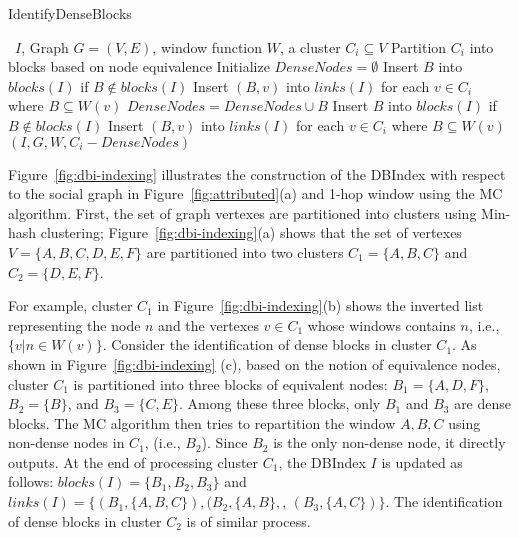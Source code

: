 \begin{algorithm}
\caption{IdentifyDenseBlocks}
\begin{algorithmic}[1] \small
\Require \DBIndex\ $I$, Graph $G=(V,E)$, window function $W$, a cluster $C_i \subseteq V$
\State Partition $C_i$ into blocks based on node equivalence
\State Initialize $DenseNodes = \emptyset$
	\State Insert $B$ into $blocks(I)$ if $B \not\in blocks(I)$
	\State Insert $(B,v)$ into $links(I)$ for each $v \in C_i$ where $B \subseteq W(v)$
	\State $DenseNodes = DenseNodes \cup B$
\EndFor
{}
		\State Insert $B$ into $blocks(I)$ if $B \not\in blocks(I)$
		\State Insert $(B,v)$ into $links(I)$ for each $v \in C_i$ where $B \subseteq W(v)$
	\EndFor
{}
		 $(I,G,W,C_i - DenseNodes)$
	\EndIf
\EndIf
\end{algorithmic}
\label{algo:identify}
\end{algorithm}

Figure~\ref{fig:dbi-indexing} 
illustrates the construction of the DBIndex with respect to the social graph in 
Figure~\ref{fig:attributed}(a) and 1-hop window using the MC algorithm.
First, the set of graph vertexes are partitioned into clusters using Min-hash clustering;
Figure~\ref{fig:dbi-indexing}(a)
shows that the set of vertexes $V = \{A, B, C, D, E, F \}$ are partitioned into two clusters $C_1=\{A, B, C\}$ and $C_2=\{D, E, F\}$. 

For example, cluster $C_1$ in 
Figure~\ref{fig:dbi-indexing}(b) shows the inverted list representing
the node $n$ and the vertexes $v \in C_1$ whose windows contains $n$, i.e., $\{v | n \in W(v) \}$.
%
Consider the identification of dense blocks in cluster $C_1$.
As shown in Figure~\ref{fig:dbi-indexing} (c), based on the notion of equivalence nodes,
cluster $C_1$ is partitioned into three blocks of equivalent nodes:
$B_1=\{A,D,F\}$, $B_2=\{B\}$, and $B_3=\{C,E\}$.
Among these three blocks, only
$B_1$ and $B_3$ are dense blocks.
The MC algorithm then tries to repartition the window $A,B,C$ using non-dense nodes in $C_1$,
(i.e., $B_2$). Since $B_2$ is the only non-dense node, it directly outputs.
At the end of processing cluster $C_1$,
the DBIndex $I$ is updated as follows:
$blocks(I) = \{B_1, B_2, B_3\}$ 
and
$links(I) = \{ (B_1,\{A,B,C\}), (B_2, \{A,B\},$, $(B_3, \{A,C\}) \}$. 
The identification of dense blocks in cluster $C_2$ 
is of similar process.

